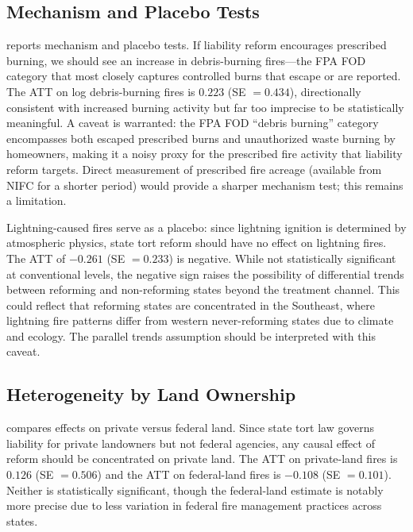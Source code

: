 \documentclass[12pt]{article}
\begin{document}


\subsection{Mechanism and Placebo Tests}

 reports mechanism and placebo tests. If liability reform encourages prescribed burning, we should see an increase in debris-burning fires---the FPA FOD category that most closely captures controlled burns that escape or are reported. The ATT on log debris-burning fires is $0.223$ (SE $= 0.434$), directionally consistent with increased burning activity but far too imprecise to be statistically meaningful. A caveat is warranted: the FPA FOD ``debris burning'' category encompasses both escaped prescribed burns and unauthorized waste burning by homeowners, making it a noisy proxy for the prescribed fire activity that liability reform targets. Direct measurement of prescribed fire acreage (available from NIFC for a shorter period) would provide a sharper mechanism test; this remains a limitation.

Lightning-caused fires serve as a placebo: since lightning ignition is determined by atmospheric physics, state tort reform should have no effect on lightning fires. The ATT of $-0.261$ (SE $= 0.233$) is negative. While not statistically significant at conventional levels, the negative sign raises the possibility of differential trends between reforming and non-reforming states beyond the treatment channel. This could reflect that reforming states are concentrated in the Southeast, where lightning fire patterns differ from western never-reforming states due to climate and ecology. The parallel trends assumption should be interpreted with this caveat.



\subsection{Heterogeneity by Land Ownership}

 compares effects on private versus federal land. Since state tort law governs liability for private landowners but not federal agencies, any causal effect of reform should be concentrated on private land. The ATT on private-land fires is $0.126$ (SE $= 0.506$) and the ATT on federal-land fires is $-0.108$ (SE $= 0.101$). Neither is statistically significant, though the federal-land estimate is notably more precise due to less variation in federal fire management practices across states.
\end{document}
